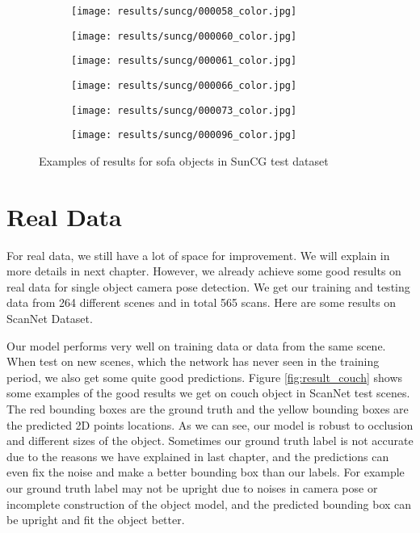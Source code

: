 \begin{figure}[h!]
\begin{subfigure}[b]{0.32\linewidth}
    \texttt{[image: results/suncg/000058\_color.jpg]}
  \end{subfigure}
  \begin{subfigure}[b]{0.32\linewidth}
    \texttt{[image: results/suncg/000060\_color.jpg]}
  \end{subfigure}
  \begin{subfigure}[b]{0.32\linewidth}
    \texttt{[image: results/suncg/000061\_color.jpg]}
  \end{subfigure}
  \begin{subfigure}[b]{0.32\linewidth}
    \texttt{[image: results/suncg/000066\_color.jpg]}
  \end{subfigure}
  \begin{subfigure}[b]{0.32\linewidth}
    \texttt{[image: results/suncg/000073\_color.jpg]}
  \end{subfigure}
  \begin{subfigure}[b]{0.32\linewidth}
    \texttt{[image: results/suncg/000096\_color.jpg]}
  \end{subfigure}
  \caption{Examples of results for sofa objects in SunCG test dataset}
  \label{fig:suncg}
\end{figure}

\section{Real Data}

For real data, we still have a lot of space for improvement. We will explain in more details in next chapter. However, we already achieve some good results on real data for single object camera pose detection. We get our training and testing data from 264 different scenes and in total 565 scans. Here are some results on ScanNet Dataset.

Our model performs very well on training data or data from the same scene. When test on new scenes, which the network has never seen in the training period, we also get some quite good predictions. Figure \ref{fig:result_couch} shows some examples of the good results we get on couch object in ScanNet test scenes. The red bounding boxes are the ground truth and the yellow bounding  boxes are the predicted 2D points locations. As we can see, our model is robust to occlusion and different sizes of the object. Sometimes our ground truth label is not accurate due to the reasons we have explained in last chapter, and the predictions can even fix the noise and make a better bounding box than our labels. For example our ground truth label may not be upright due to noises in camera pose or incomplete construction of the object model, and the predicted bounding box can be upright and fit the object better.


